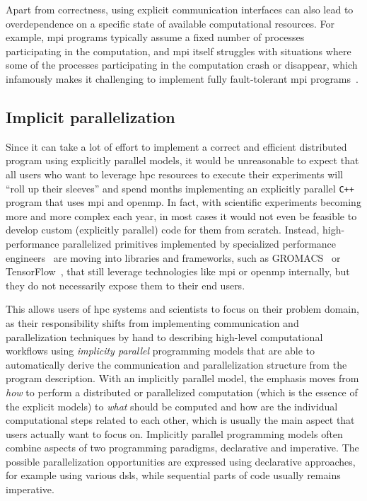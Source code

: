 Apart from correctness, using explicit communication interfaces can also lead to overdependence on
a specific state of available computational resources. For example, \gls{mpi}
programs typically assume a fixed number of processes participating in the computation, and
\gls{mpi} itself struggles with situations where some of the processes
participating in the computation crash or disappear, which infamously makes it challenging to
implement fully fault-tolerant \gls{mpi} programs~\cite{fault_tolerant_mpi}.

\subsection*{Implicit parallelization}
Since it can take a lot of effort to implement a correct and efficient distributed program using
explicitly parallel models, it would be unreasonable to expect that all users who want to leverage
\gls{hpc} resources to execute their experiments will ``roll up their sleeves''
and spend months implementing an explicitly parallel \texttt{C++} program that uses
\gls{mpi} and \gls{openmp}. In fact, with scientific experiments
becoming more and more complex each year, in most cases it would not even be feasible to develop
custom (explicitly parallel) code for them from scratch. Instead, high-performance parallelized
primitives implemented by specialized performance engineers~\cite{dace} are moving
into libraries and frameworks, such as GROMACS~\cite{gromacs,gromacs_mpi} or
TensorFlow~\cite{tensorflow,horovod}, that still leverage technologies like
\gls{mpi} or \gls{openmp} internally, but they do not necessarily
expose them to their end users.

This allows users of \gls{hpc} systems and scientists to focus on their problem
domain, as their responsibility shifts from implementing communication and parallelization
techniques by hand to describing high-level computational workflows using
\emph{implicity parallel} programming models that are able to automatically derive the
communication and parallelization structure from the program description. With an implicitly
parallel model, the emphasis moves from \emph{how} to perform a distributed or
parallelized computation (which is the essence of the explicit models) to
\emph{what} should be computed and how are the individual computational steps
related to each other, which is usually the main aspect that users actually want to focus on.
Implicitly parallel programming models often combine aspects of two programming paradigms,
declarative and imperative. The possible parallelization opportunities are expressed using
declarative approaches, for example using various \glspl{dsl}, while sequential
parts of code usually remains imperative.

